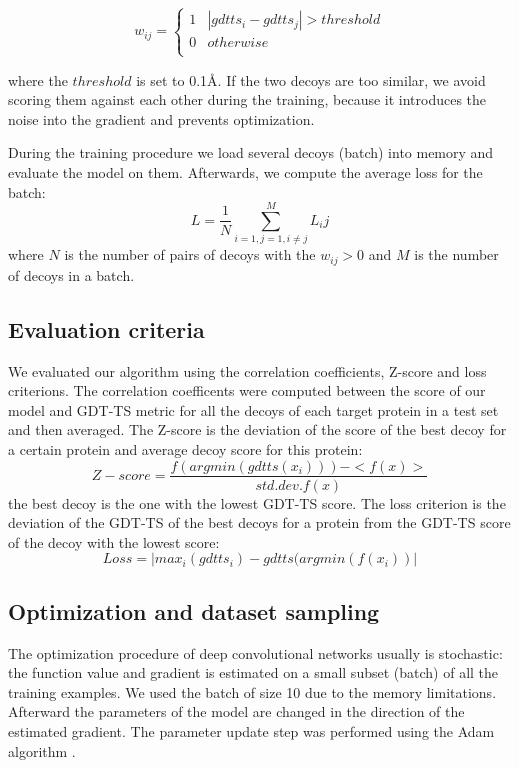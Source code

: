 \documentclass[a4paper,10pt]{article}
\begin{document}
$$
w_{ij} = \begin{cases}
               1& \left| gdtts_i - gdtts_j \right| > threshold \\
               0& otherwise \\ 
            \end{cases}
$$

where the $threshold$ is set to 0.1{\AA}. If the two decoys are too similar, 
we avoid scoring them against each other during the training, because it introduces 
the noise into the gradient and prevents optimization.


During the training procedure we load several decoys (batch) into memory and evaluate the model on them. 
Afterwards, we compute the average loss for the batch:
$$ L = \frac{1}{N} \sum_{i=1,j=1, i \neq j}^{M} L_ij $$ 
where $N$ is the number of pairs of decoys with the $w_{ij} > 0$ and $M$ is the number of decoys in a batch.

\subsection{Evaluation criteria}
We evaluated our algorithm using the correlation coefficients, Z-score and loss criterions. The correlation coefficents 
were computed between the score of 
our model and GDT-TS metric for all the decoys of each target protein in a test set and then averaged. 
The Z-score is the deviation of the score of 
the best decoy for a certain protein and average decoy score for this protein:
$$ 
Z-score = \frac{f( argmin(gdtts(x_i)) ) - <f(x)>}{std.dev.f(x)}
$$ 
the best decoy is the one with the lowest GDT-TS score. 
The loss criterion is the deviation of the GDT-TS of the best decoys for a protein from the GDT-TS score of the decoy with the lowest score:
$$ 
Loss = | max_i( gdtts_i ) - gdtts( argmin(f(x_i) ) |
$$ 

\subsection{Optimization and dataset sampling}
The optimization procedure of deep convolutional networks usually is stochastic: the function value and gradient 
is estimated on a small subset (batch) of all the training 
examples. We used the batch of size 10 due to the memory limitations. Afterward the parameters of the model are 
changed in the direction of the estimated gradient.
The parameter update step was performed using the Adam algorithm \cite{}. 
\end{document}
